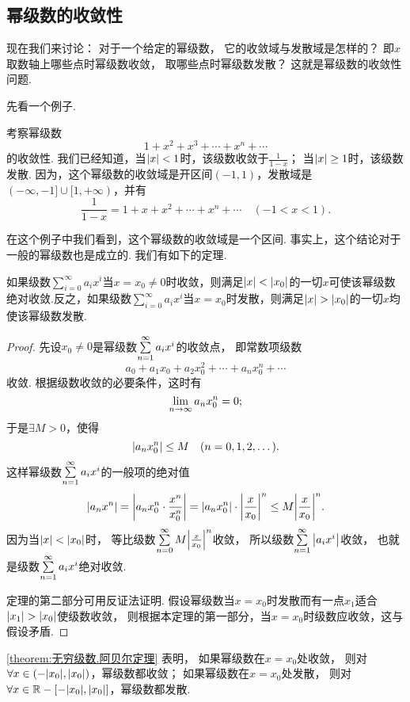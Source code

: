 \subsection{幂级数的收敛性}
现在我们来讨论：
对于一个给定的幂级数，%
它的收敛域与发散域是怎样的？
即\(x\)取数轴上哪些点时幂级数收敛，%
取哪些点时幂级数发散？
这就是幂级数的收敛性问题.

先看一个例子.
\begin{example}
考察幂级数\[
1+x^2+x^3+\dotsb+x^n+\dotsb
\]的收敛性.
我们已经知道，当\(\abs{x}<1\)时，该级数收敛于\(\frac{1}{1-x}\)；
当\(\abs{x}\geq1\)时，该级数发散.
因为，这个幂级数的收敛域是开区间\((-1,1)\)，发散域是\((-\infty,-1]\cup[1,+\infty)\)，并有\[
\frac{1}{1-x} = 1+x+x^2+\dotsb+x^n+\dotsb
\quad(-1<x<1).
\]
\end{example}

在这个例子中我们看到，这个幂级数的收敛域是一个区间.
事实上，这个结论对于一般的幂级数也是成立的.
我们有如下的定理.

\begin{theorem}[阿贝尔定理]\label{theorem:无穷级数.阿贝尔定理}
如果级数\(\sum\limits_{i=0}^\infty a_i x^i\)当\(x=x_0\neq0\)时收敛，则满足\(\abs{x}<\abs{x_0}\)的一切\(x\)可使该幂级数绝对收敛.反之，如果级数\(\sum\limits_{i=0}^\infty a_i x^i\)当\(x=x_0\)时发散，则满足\(\abs{x}>\abs{x_0}\)的一切\(x\)均使该幂级数发散.
\begin{proof}
先设\(x_0\neq0\)是幂级数\(\sum\limits_{n=1}^\infty a_i x^i\)的收敛点，%
即常数项级数\[
a_0 + a_1 x_0 + a_2 x_0^2 + \dotsb + a_n x_0^n + \dotsb
\]收敛.
根据级数收敛的必要条件，这时有\[
\lim\limits_{n\to\infty} a_n x_0^n = 0;
\]
于是\(\exists M > 0\)，使得\[
\abs{a_n x_0^n} \leq M
\quad(n=0,1,2,\dotsc).
\]
这样幂级数\(\sum\limits_{n=1}^\infty a_i x^i\)的一般项的绝对值\[
\abs{a_n x^n} = \abs{a_n x_0^n \cdot \frac{x^n}{x_0^n}}
= \abs{a_n x_0^n} \cdot \abs{\frac{x}{x_0}}^n
\leq M \abs{\frac{x}{x_0}}^n.
\]
因为当\(\abs{x}<\abs{x_0}\)时，%
等比级数\(\sum\limits_{n=0}^\infty M \abs{\frac{x}{x_0}}^n\)收敛，%
所以级数\(\sum\limits_{n=1}^\infty \abs{a_i x^i}\)收敛，%
也就是级数\(\sum\limits_{n=1}^\infty a_i x^i\)绝对收敛.

定理的第二部分可用反证法证明.
假设幂级数当\(x=x_0\)时发散而有一点\(x_1\)适合\(\abs{x_1}>\abs{x_0}\)使级数收敛，%
则根据本定理的第一部分，当\(x=x_0\)时级数应收敛，这与假设矛盾.
\end{proof}
\end{theorem}

\cref{theorem:无穷级数.阿贝尔定理} 表明，%
如果幂级数在\(x=x_0\)处收敛，%
则对\(\forall x\in(-\abs{x_0},\abs{x_0})\)，幂级数都收敛；
如果幂级数在\(x=x_0\)处发散，%
则对\(\forall x\in\mathbb{R}-[-\abs{x_0},\abs{x_0}]\)，幂级数都发散.

